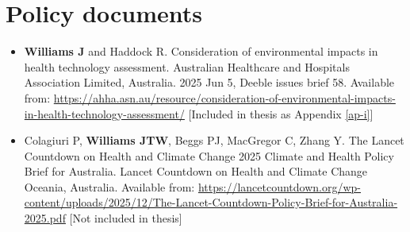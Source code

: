 \section*{Policy documents}
\begin{itemize}
    \item \textbf{Williams J} and Haddock R. Consideration of environmental impacts in health technology assessment. Australian Healthcare and Hospitals Association Limited, Australia. 2025 Jun 5, Deeble issues brief 58. Available from: \url{https://ahha.asn.au/resource/consideration-of-environmental-impacts-in-health-technology-assessment/} [Included in thesis as Appendix \ref{ap-i}]
    \item Colagiuri P, \textbf{Williams JTW}, Beggs PJ, MacGregor C, Zhang Y. The Lancet Countdown on Health and Climate Change 2025 Climate and Health Policy Brief for Australia. Lancet Countdown on Health and Climate Change Oceania, Australia. Available from: \url{https://lancetcountdown.org/wp-content/uploads/2025/12/The-Lancet-Countdown-Policy-Brief-for-Australia-2025.pdf} [Not included in thesis]
\end{itemize}

